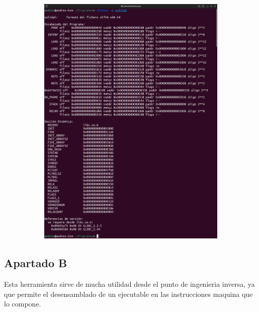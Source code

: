 \documentclass{article}
\begin{document}
\begin{itemize}
\begin{figure}[H]
\begin{subfigure}{0.49\textwidth}
            \includegraphics[width=\textwidth]{imagenes/mergedobjdumpp}
        \end{subfigure}
    \end{figure}    

\end{itemize}


\subsection*{Apartado B}

Esta herramienta sirve de mucha utilidad desde el punto de ingenieria inversa, ya que permite el desensamblado de un ejecutable en las instrucciones maquina que lo compone.
\end{document}
